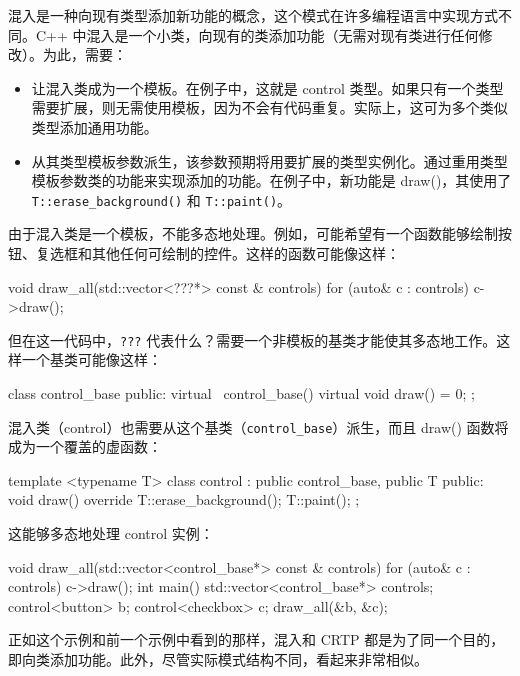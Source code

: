 
混入是一种向现有类型添加新功能的概念，这个模式在许多编程语言中实现方式不同。C++ 中混入是一个小类，向现有的类添加功能（无需对现有类进行任何修改）。为此，需要：

\begin{itemize}
\item
让混入类成为一个模板。在例子中，这就是 control 类型。如果只有一个类型需要扩展，则无需使用模板，因为不会有代码重复。实际上，这可为多个类似类型添加通用功能。

\item
从其类型模板参数派生，该参数预期将用要扩展的类型实例化。通过重用类型模板参数类的功能来实现添加的功能。在例子中，新功能是 draw()，其使用了 \verb|T::erase_background()| 和 \verb|T::paint()|。
\end{itemize}

由于混入类是一个模板，不能多态地处理。例如，可能希望有一个函数能够绘制按钮、复选框和其他任何可绘制的控件。这样的函数可能像这样：

\begin{cpp}
void draw_all(std::vector<???*> const & controls)
{
    for (auto& c : controls)
    {
        c->draw();
    }
}
\end{cpp}

但在这一代码中，\verb|???| 代表什么？需要一个非模板的基类才能使其多态地工作。这样一个基类可能像这样：

\begin{cpp}
class control_base
{
    public:
    virtual ~control_base() {}
    virtual void draw() = 0;
};
\end{cpp}

混入类（control）也需要从这个基类（\verb|control_base|）派生，而且 draw() 函数将成为一个覆盖的虚函数：

\begin{cpp}
template <typename T>
class control : public control_base, public T
{
public:
    void draw() override
    {
        T::erase_background();
        T::paint();
    }
};
\end{cpp}

这能够多态地处理 control 实例：

\begin{cpp}
void draw_all(std::vector<control_base*> const & controls)
{
    for (auto& c : controls)
    {
        c->draw();
    }
}
int main()
{
    std::vector<control_base*> controls;
    control<button> b;
    control<checkbox> c;
    draw_all({&b, &c});
}
\end{cpp}

正如这个示例和前一个示例中看到的那样，混入和 CRTP 都是为了同一个目的，即向类添加功能。此外，尽管实际模式结构不同，看起来非常相似。


